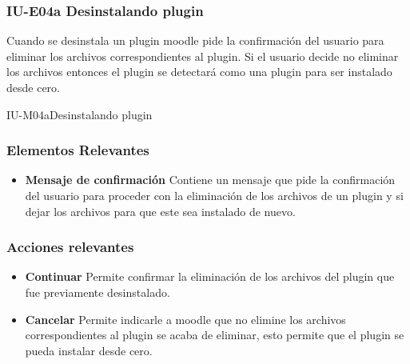 
\subsubsection{IU-E04a Desinstalando plugin}

 Cuando se desinstala un plugin moodle pide la confirmación del usuario para eliminar
 los archivos correspondientes al plugin. Si el usuario decide no eliminar los
 archivos entonces el plugin se detectará como una plugin para ser instalado desde
 cero.

        {IU-M04a}{Desinstalando plugin}

\subsubsection{Elementos Relevantes}

    \begin{itemize}
    \item {\bf Mensaje de confirmación}
        Contiene un mensaje que pide la confirmación del usuario para proceder con
        la eliminación de los archivos de un plugin y si dejar los archivos para que
        este sea instalado de nuevo.
    \end{itemize}

\subsubsection{Acciones relevantes}

    \begin{itemize}
    \item {\bf Continuar}
        Permite confirmar la eliminación de los archivos del plugin que fue
        previamente desinstalado.

    \item {\bf Cancelar}
        Permite indicarle a moodle que no elimine los archivos correspondientes al
        plugin se acaba de eliminar, esto permite que el plugin se pueda instalar
        desde cero.
    \end{itemize}

\clearpage

